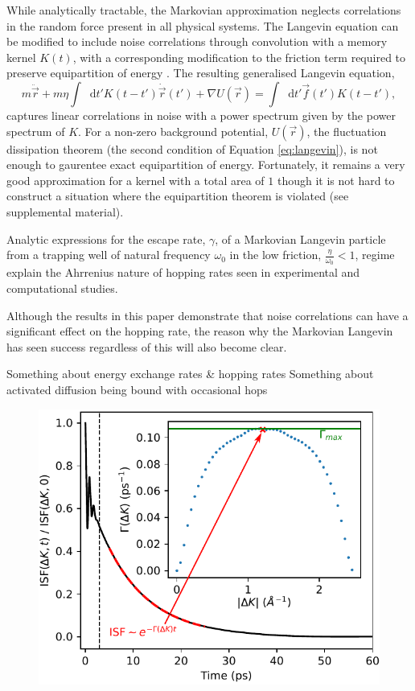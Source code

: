 \documentclass[7pt]{article}
\newcommand*{\diff}{\mathop{}\!\mathrm{d}}
\begin{document}
While analytically tractable, the Markovian approximation neglects correlations in the random force present in all physical systems. The Langevin equation can be modified to include noise correlations through convolution with a memory kernel $K(t)$, with a corresponding modification to the friction term required to preserve equipartition of energy \cite{Kubo}. The resulting generalised Langevin equation, 
\begin{equation}
	m\ddot{\vec{r}}+m\eta\int\diff{t'}K(t-t')\dot{\vec{r}}(t')+\nabla U(\vec{r})=\int\diff{t'}\vec{f}(t')K(t-t'),
	\label{eq:gle}
\end{equation}
captures linear correlations in noise with a power spectrum given by the power spectrum of $K$. For a non-zero background potential, $U(\vec{r})$, the fluctuation dissipation theorem (the second condition of Equation \ref{eq:langevin}), is not enough to gaurentee exact equipartition of energy. Fortunately, it remains a very good approximation for a kernel with a total area of $1$ though it is not hard to construct a situation where the equipartition theorem is violated (see supplemental material). 


Analytic expressions for the escape rate, $\gamma$, of a Markovian Langevin particle from a trapping well of natural frequency $\omega_0$ in the low friction, $\frac{\eta}{\omega_0} < 1$, regime explain the Ahrrenius nature of hopping rates seen in experimental and computational studies. 

Although the results in this paper demonstrate that noise correlations can have a significant effect on the hopping rate, the reason why the Markovian Langevin has seen success regardless of this will also become clear.

Something about energy exchange rates \& hopping rates
Something about activated diffusion being bound with occasional hops

\begin{figure}
	\centering
	\includegraphics{isf_dk}
	\caption{}
	\label{fig:isf_dk}
\end{figure}
\end{document}
